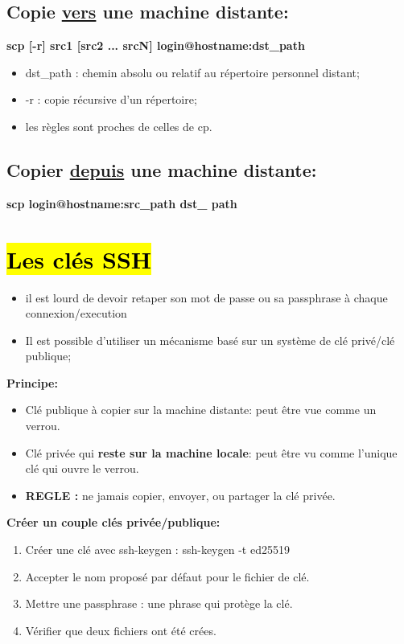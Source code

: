\documentclass{article}
\begin{document}
\subsection*{\textbf{Copie \underline{vers} une machine distante:}}
\textbf{scp [-r] src1 [src2 ... srcN] login@hostname:dst\_path}

\begin{itemize}
    \item dst\_path : chemin absolu ou relatif au répertoire personnel distant; 
    \item -r : copie récursive d'un répertoire; 
    \item les règles sont proches de celles de cp.
\end{itemize}

\subsection*{\textbf{Copier \underline{depuis} une machine distante:}}

\textbf{scp login@hostname:src\_path dst\_ path}

\section*{\hl{\textbf{Les clés SSH}}}

\begin{itemize}
    \item il est lourd de devoir retaper son mot de passe ou sa passphrase à chaque connexion/execution 
    \item Il est possible d'utiliser un mécanisme basé sur un système de clé privé/clé publique; 
\end{itemize}

\textbf{Principe:}
\begin{itemize}
    \item Clé publique à copier sur la machine distante: peut être vue comme un verrou.
    \item Clé privée qui \textbf{reste sur la machine locale}: peut être vu comme l'unique clé qui ouvre le verrou.
    \item \textbf{REGLE :} ne jamais copier, envoyer, ou partager la clé privée.
\end{itemize}

\textbf{Créer un couple clés privée/publique:}
\begin{enumerate}
    \item Créer une clé avec ssh-keygen : 
    \subitem ssh-keygen -t ed25519
    \item Accepter le nom proposé par défaut pour le fichier de clé.
    \item Mettre une passphrase : une phrase qui protège la clé.
    \item Vérifier que deux fichiers ont été crées.
\end{enumerate}
\end{document}
